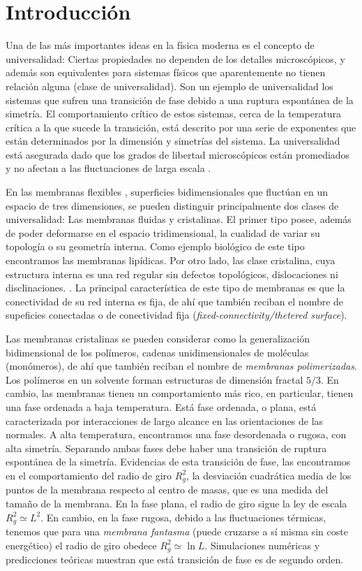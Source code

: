 \chapter{Introducción}

Una de las más importantes ideas en la física moderna es el concepto de
universalidad: Ciertas propiedades no dependen de los
detalles microscópicos, y además son equivalentes para sistemas
físicos que aparentemente no tienen relación alguna (clase de universalidad). Son un ejemplo de universalidad los sistemas que sufren una transición de fase debido a una ruptura
espontánea de la simetría. El comportamiento crítico de estos sistemas, cerca
de la temperatura crítica a la que sucede la transición, está descrito por una
serie de exponentes que están determinados por la dimensión y simetrías del
sistema. La universalidad está asegurada dado que los grados de libertad
microscópicos están promediados y no afectan a las fluctuaciones de larga
escala \cite{Kay:Polimerized_Membranes}. 

En las membranas flexibles \cite{Bowick_flat_phase}, superficies bidimensionales que fluctúan en un
espacio de tres dimensiones, se pueden distinguir principalmente dos clases de
universalidad: Las membranas fluidas y cristalinas. El primer tipo posee, además de poder
deformarse en el espacio tridimensional, la cualidad de variar su topología o
su geometría interna. Como ejemplo biológico de este tipo encontramos las
membranas lipídicas. Por otro lado, las clase cristalina, cuya estructura
interna es una red regular sin defectos topológicos, dislocaciones ni disclinaciones.  
. La principal característica de este tipo de membranas es que la conectividad
de su red interna es fija, de ahí que también reciban el nombre de supeficies
conectadas o de conectividad fija (\textit{fixed-connectivity/thetered surface}).  

Las membranas cristalinas se pueden considerar como la
generalización bidimensional de los polímeros, cadenas unidimensionales
de moléculas (monómeros), de ahí que también reciban el nombre de
\textit{membranas polimerizadas}. Los polímeros en un solvente forman
estructuras de dimensión fractal $5/3$. En cambio, las membranas tienen un
comportamiento más rico, en particular, tienen una fase ordenada a baja
temperatura. Está fase ordenada, o plana, está caracterizada por interacciones
de largo alcance en las orientaciones de las normales. A alta temperatura,
encontramos una fase desordenada o rugosa, con alta simetría. Separando ambas fases debe haber
una transición de ruptura espontánea de la simetría. Evidencias de esta
transición de fase, las encontramos en el comportamiento del radio de giro
$R^2_g$, la desviación cuadrática media de los puntos de la membrana respecto
al centro de masas, que es una medida del tamaño de la membrana. En la fase
plana, el radio de giro sigue la ley de escala $R^2_g\simeq L^2$. En cambio,
en la fase rugosa, debido a las fluctuaciones térmicas, tenemos que para una \textit{membrana
fantasma} (puede cruzarse a sí misma sin coste energético) el radio de giro
obedece $R^2_g\simeq \ln L$. Simulaciones numéricas \cite{Bowick_flat_phase}\cite{Espriu:MCRG}
y predicciones teóricas \cite{Doussal:nu} muestran que está transición de fase es de segundo orden.

